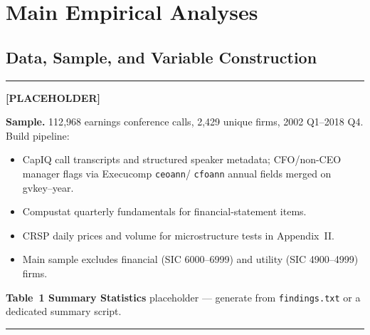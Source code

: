 \documentclass[11pt,a4paper,twocolumn]{article}
\newenvironment{placeholder}{%
  \par\medskip\noindent%
  {\color{placeholderaccent}\rule{\linewidth}{0.4pt}}\par%
  \noindent\textbf{\color{placeholderaccent}[PLACEHOLDER]}\par%
  \smallskip\itshape%
}{%
  \par\upshape\smallskip%
  {\color{placeholderaccent}\rule{\linewidth}{0.4pt}}\par\medskip%
}
\begin{document}
\clearpage

\section{Main Empirical Analyses}
\label{sec:main}

\subsection{Data, Sample, and Variable Construction}
\label{sec:data}
\begin{placeholder}
\textbf{Sample.} 112{,}968 earnings conference calls, 2{,}429 unique
firms, 2002 Q1--2018 Q4. Build pipeline:
\begin{itemize}
  \item CapIQ call transcripts and structured speaker metadata;
        CFO/non-CEO manager flags via Execucomp \texttt{ceoann}/
        \texttt{cfoann} annual fields merged on gvkey--year.
  \item Compustat quarterly fundamentals for financial-statement items.
  \item CRSP daily prices and volume for microstructure tests in
        Appendix~II.
  \item Main sample excludes financial (SIC 6000--6999) and utility
        (SIC 4900--4999) firms.
\end{itemize}
\textbf{Table~1 Summary Statistics} placeholder --- generate from
\texttt{findings.txt} or a dedicated summary script.
\end{placeholder}

\end{document}
